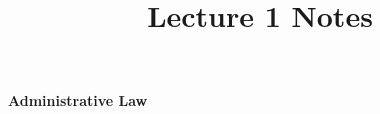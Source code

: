 \documentclass[11pt]{article}
\theoremstyle{definition}
\begin{document}
\setcounter{section}{0}
\title{Lecture 1 Notes}

\thispagestyle{empty}

\begin{center}

    {\LARGE \bf Administrative Law}\\
  
\end{center}












\end{document}
